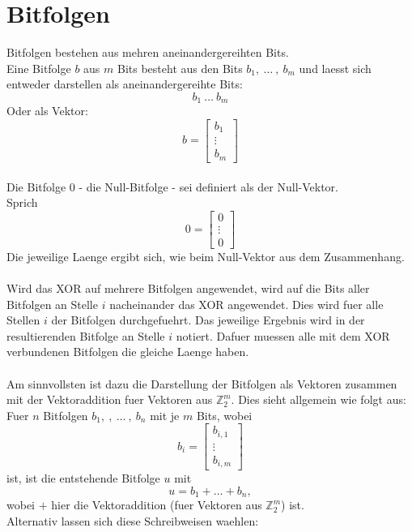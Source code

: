 \documentclass[a4paper,10pt,ngerman]{scrartcl}
\begin{document}
\section{Bitfolgen}
Bitfolgen bestehen aus mehren aneinandergereihten Bits.\\
Eine Bitfolge $b$ aus $m$ Bits besteht aus den Bits $b_1, \ \dots \ , \ b_m$ und laesst sich entweder darstellen als aneinandergereihte Bits:
$$
b_1 \ \dots \ b_m
$$
Oder als Vektor:
$$
b = \begin{bmatrix}
           b_1 \\
           \vdots \\
           b_m
         \end{bmatrix} 
$$
\\
Die Bitfolge $0$ - die Null-Bitfolge - sei definiert als der Null-Vektor.\\
Sprich
$$
0 = \begin{bmatrix}
           0 \\
           \vdots \\
           0
         \end{bmatrix} 
$$
Die jeweilige Laenge ergibt sich, wie beim Null-Vektor aus dem Zusammenhang.
\\
\\
Wird das XOR auf mehrere Bitfolgen angewendet, wird auf die Bits aller Bitfolgen an Stelle $i$ nacheinander das XOR angewendet. Dies wird fuer alle Stellen $i$ der Bitfolgen durchgefuehrt. Das jeweilige Ergebnis wird in der resultierenden Bitfolge an Stelle $i$ notiert.
Dafuer muessen alle mit dem XOR verbundenen Bitfolgen die gleiche Laenge haben.\\
\\
Am sinnvollsten ist dazu die Darstellung der Bitfolgen als Vektoren zusammen mit der Vektoraddition fuer Vektoren aus \(\mathbb{Z}_{2}^{m}\).
Dies sieht allgemein wie folgt aus:\\
Fuer \(n\) Bitfolgen $b_1, \ , \ \dots \ , \ b_n$ mit je \(m\) Bits, wobei 
$$
b_i = \begin{bmatrix}
           b_{i, 1} \\
           \vdots \\
           b_{i, m}
         \end{bmatrix}
$$
ist, ist die entstehende Bitfolge $u$ mit
$$
u = b_1 + \dots + b_n,
$$
wobei $+$ hier die Vektoraddition (fuer Vektoren aus \(\mathbb{Z}_{2}^{m}\)) ist.\\
Alternativ lassen sich diese Schreibweisen waehlen:\\
\end{document}
